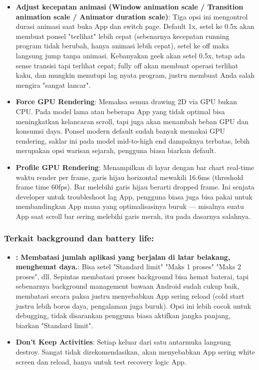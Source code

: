 \begin{itemize}
  \item \textbf{Adjust kecepatan animasi (Window animation scale / Transition animation scale / Animator duration scale)}: Tiga opsi ini mengontrol durasi animasi saat buka App dan switch page. Default 1x, setel ke 0.5x akan membuat ponsel "terlihat" lebih cepat (sebenarnya kecepatan running program tidak berubah, hanya animasi lebih cepat), setel ke off maka langsung jump tanpa animasi. Kebanyakan geek akan setel 0.5x, tetap ada sense transisi tapi terlihat cepat; fully off akan membuat operasi terlihat kaku, dan mungkin menutupi lag nyata program, justru membuat Anda salah mengira "sangat lancar".
  \item \textbf{Force GPU Rendering}: Memaksa semua drawing 2D via GPU bukan CPU. Pada model lama atau beberapa App yang tidak optimal bisa meningkatkan kelancaran scroll, tapi juga akan menambah beban GPU dan konsumsi daya. Ponsel modern default sudah banyak memakai GPU rendering, saklar ini pada model mid-to-high end dampaknya terbatas, lebih merupakan opsi warisan sejarah, pengguna biasa biarkan default.
  \item \textbf{Profile GPU Rendering}: Menampilkan di layar dengan bar chart real-time waktu render per frame, garis hijau horizontal mewakili 16.6ms (threshold frame time 60fps). Bar melebihi garis hijau berarti dropped frame. Ini senjata developer untuk troubleshoot lag App, pengguna biasa juga bisa pakai untuk membandingkan App mana yang optimalisasinya buruk — misalnya suatu App saat scroll bar sering melebihi garis merah, itu pada dasarnya salahnya.
\end{itemize}

\subsubsection*{Terkait background dan battery life:}

\begin{itemize}
  \item \textbf{: Membatasi jumlah aplikasi yang berjalan di latar belakang, menghemat daya.}: Bisa setel "Standard limit" "Maks 1 proses" "Maks 2 proses", dll. Sepintas membatasi proses background bisa hemat baterai, tapi sebenarnya background management bawaan Android sudah cukup baik, membatasi secara paksa justru menyebabkan App sering reload (cold start justru lebih boros daya, pengalaman juga buruk). Opsi ini lebih cocok untuk debugging, tidak disarankan pengguna biasa aktifkan jangka panjang, biarkan "Standard limit".
  \item \textbf{Don't Keep Activities}: Setiap keluar dari satu antarmuka langsung destroy. Sangat tidak direkomendasikan, akan menyebabkan App sering white screen dan reload, hanya untuk test recovery logic App.
\end{itemize}

